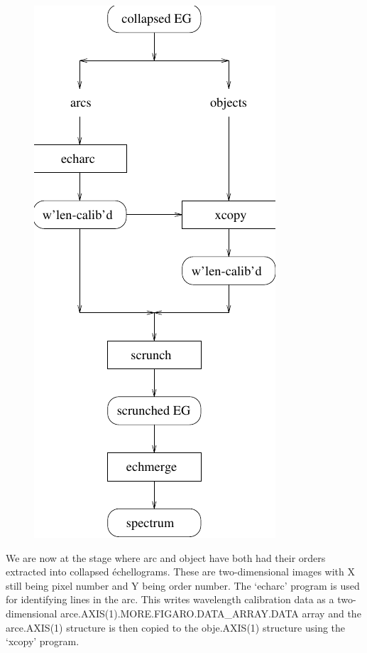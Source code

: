 \documentclass[11pt,twoside]{article}
\newcommand{\htmladdimg}[1]{}
\newenvironment{latexonly}{}{}
\begin{document}
\begin{latexonly}
\begin{figure}[htb]
\begin{center}
\includegraphics{sun86_ech4}
\end{center}
\end{figure}
\end{latexonly}
\htmladdimg{echelle4.png}

   We are now at the stage where arc and object have both had their
   orders extracted into collapsed \'echellograms. These are
   two-dimensional images with X still being pixel number and Y being
   order number. The `echarc' program is used for identifying lines in
   the arc. This writes wavelength calibration data as a two-dimensional
   arce.\-AXIS(1).\-MORE.\-FIGARO.\-DATA\_\-ARRAY.\-DATA array and the
   arce.AXIS(1) structure is then copied to the obje.AXIS(1) structure
   using the `xcopy' program.
\end{document}
